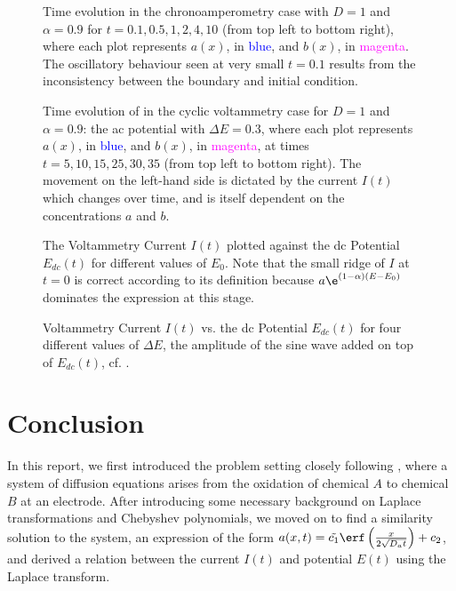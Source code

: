\documentclass{prettytex/ox/mmsc-special-topic}
\begin{document}
  \begin{figure}[H]
    \centering
    \caption{Time evolution in the chronoamperometry case with $D=1$ and $\alpha = 0.9$ for $t = 0.1, 0.5, 1, 2, 4, 10$ (from top left to bottom right), where each plot represents $a(x)$, in \textcolor{blue}{blue}, and $b(x)$, in \textcolor{magenta}{magenta}. The oscillatory behaviour seen at very small $t = 0.1$ results from the inconsistency between the boundary and initial condition.}
    \label{fig:chronoamperometry}
  \end{figure}

  \begin{figure}[H]
    \centering
    \caption{Time evolution of in the cyclic voltammetry case for $D=1$ and $\alpha = 0.9$: the \gls{ac} potential with $\Delta E = 0.3$, where each plot represents $a(x)$, in \textcolor{blue}{blue}, and $b(x)$, in \textcolor{magenta}{magenta}, at times $t = 5, 10, 15, 25, 30, 35$ (from top left to bottom right). The movement on the left-hand side is dictated by the current $I(t)$ which changes over time, and is itself dependent on the concentrations $a$ and $b$.}
    \label{fig:ac-voltammetry}
  \end{figure}

  \begin{figure}[H]
    \centering
    \caption{The Voltammetry Current $I(t)$ plotted against the \gls{dc} Potential $E_{dc}(t)$ for different values of $E_0$. Note that the small ridge of $I$ at $t = 0$ is correct according to its definition because $a \e^{(1-\alpha)(E - E_0)}$ dominates the expression at this stage.}
    \label{fig:different-E0s}
  \end{figure}

  \begin{figure}[H]
    \centering
    \caption{Voltammetry Current $I(t)$ vs. the \gls{dc} Potential $E_{dc}(t)$ for four different values of $\Delta E$, the amplitude of the sine wave added on top of $E_{dc}(t)$, cf. .}
    \label{fig:voltammetry-current}
  \end{figure}

  \section{Conclusion}
  In this report, we first introduced the problem setting closely following \cite{Gavaghan2000Jan}, where a system of diffusion equations arises from the oxidation of chemical $A$ to chemical $B$ at an electrode.
  After introducing some necessary background on Laplace transformations and Chebyshev polynomials, we moved on to find a similarity solution to the system, an expression of the form $a(x, t) = \tilde{c_1} \erf\left(\frac{x}{2\sqrt{D_a t}}\right) + c_2$, and derived a relation between the current $I(t)$ and potential $E(t)$ using the Laplace transform.
\end{document}
